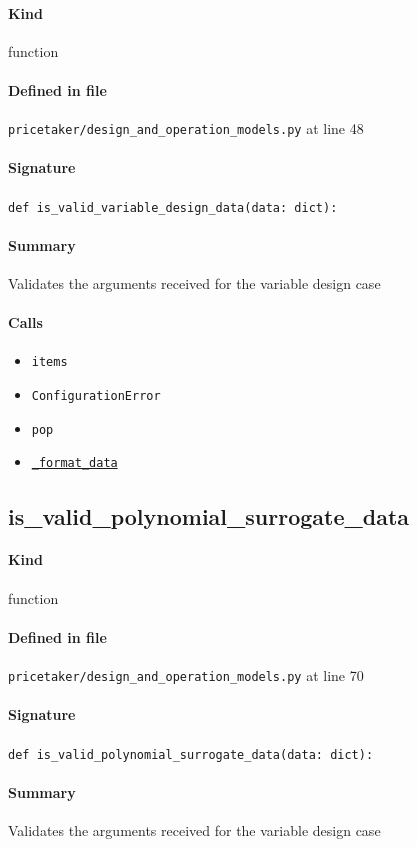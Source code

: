 \documentclass[11pt]{report}
\begin{document}
\paragraph{Kind} function
\paragraph{Defined in file} \texttt{pricetaker/design\_and\_operation\_models.py} at line 48
\paragraph{Signature} \texttt{def is\_valid\_variable\_design\_data(data: dict):}
\paragraph{Summary} Validates the arguments received for the variable design case
\paragraph{Calls}
\begin{itemize}[leftmargin=*]
  \item \texttt{items}
  \item \texttt{ConfigurationError}
  \item \texttt{pop}
  \item \hyperref[def:pricetaker-design_and_operation_models.py:_format_data:L30]{\texttt{\_format\_data}}
\end{itemize}
\subsection{is\_valid\_polynomial\_surrogate\_data}
\label{def:pricetaker-design_and_operation_models.py:is_valid_polynomial_surrogate_data:L70}
\paragraph{Kind} function
\paragraph{Defined in file} \texttt{pricetaker/design\_and\_operation\_models.py} at line 70
\paragraph{Signature} \texttt{def is\_valid\_polynomial\_surrogate\_data(data: dict):}
\paragraph{Summary} Validates the arguments received for the variable design case
\end{document}
